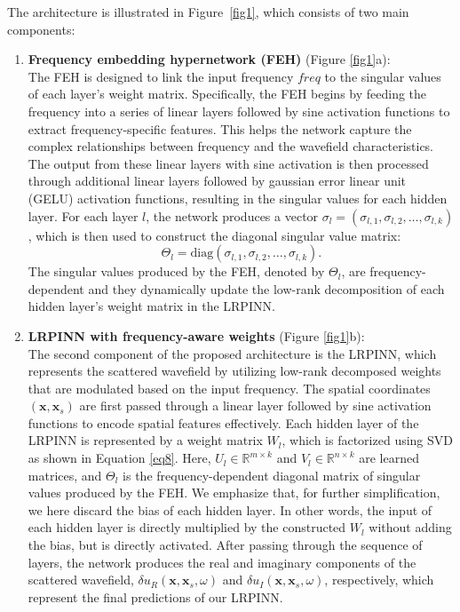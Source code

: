 The architecture is illustrated in Figure~\ref{fig1}, which consists of two main components:
\begin{enumerate}
    \item \textbf{Frequency embedding hypernetwork (FEH)} (Figure \ref{fig1}a): \\
    The FEH is designed to link the input frequency $\textit{freq}$ to the singular values of each layer’s weight matrix. Specifically, the FEH begins by feeding the frequency into a series of linear layers followed by sine activation functions to extract frequency-specific features. This helps the network capture the complex relationships between frequency and the wavefield characteristics. The output from these linear layers with sine activation is then processed through additional linear layers followed by gaussian error linear unit (GELU) activation functions, resulting in the singular values for each hidden layer. For each layer $l$, the network produces a vector $\sigma_l=(\sigma_{l,1}, \sigma_{l,2}, \dots, \sigma_{l,k})$, which is then used to construct the diagonal singular value matrix: 
    \begin{equation}
    \Theta_l = \text{diag}(\sigma_{l,1}, \sigma_{l,2}, \dots, \sigma_{l,k}).
     \end{equation}
    The singular values produced by the FEH, denoted by $\Theta_l$, are frequency-dependent and they dynamically update the low-rank decomposition of each hidden layer’s weight matrix in the LRPINN. 
    \item \textbf{LRPINN with frequency-aware weights} (Figure \ref{fig1}b): \\
    The second component of the proposed architecture is the LRPINN, which represents the scattered wavefield by utilizing low-rank decomposed weights that are modulated based on the input frequency. The spatial coordinates $(\mathbf{x}, \mathbf{x}_s)$ are first passed through a linear layer followed by sine activation functions to encode spatial features effectively. Each hidden layer of the LRPINN is represented by a weight matrix $W_l$, which is factorized using SVD as shown in Equation \ref{eq8}. Here, $U_l \in \mathbb{R}^{m \times k}$ and $V_l \in \mathbb{R}^{n \times k}$ are learned matrices, and $\Theta_l$ is the frequency-dependent diagonal matrix of singular values produced by the FEH. We emphasize that, for further simplification, we here discard the bias of each hidden layer. In other words, the input of each hidden layer is directly multiplied by the constructed $W_l$ without adding the bias, but is directly activated. After passing through the sequence of layers, the network produces the real and imaginary components of the scattered wavefield, $\delta u_R(\mathbf{x}, \mathbf{x}_s, \omega)$ and $\delta u_I(\mathbf{x}, \mathbf{x}_s, \omega)$, respectively, which represent the final predictions of our LRPINN.

\end{enumerate}

